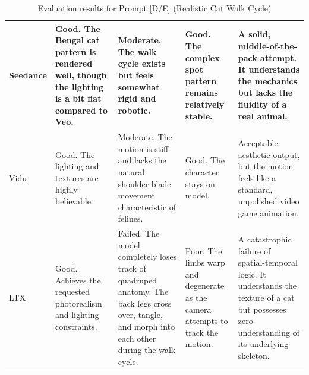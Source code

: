 \documentclass[sigconf]{acmart}
\begin{document}
\begin{table}[H]
\begin{tabularx}{\textwidth}{| l | >{\raggedright\arraybackslash}X | >{\raggedright\arraybackslash}X | >{\raggedright\arraybackslash}X | >{\raggedright\arraybackslash}X |}
        Seedance       & Good. The Bengal cat pattern is rendered well, though the lighting is a bit flat compared to Veo. & Moderate. The walk cycle exists but feels somewhat rigid and robotic.                                                                                                & Good. The complex spot pattern remains relatively stable.                                     & A solid, middle-of-the-pack attempt. It understands the mechanics but lacks the fluidity of a real animal.                                         \\\hline
        Vidu           & Good. The lighting and textures are highly believable.                                            & Moderate. The motion is stiff and lacks the natural shoulder blade movement characteristic of felines.                                                               & Good. The character stays on model.                                                           & Acceptable aesthetic output, but the motion feels like a standard, unpolished video game animation.                                                \\\hline
        LTX            & Good. Achieves the requested photorealism and lighting constraints.                               & Failed. The model completely loses track of quadruped anatomy. The back legs cross over, tangle, and morph into each other during the walk cycle.                    & Poor. The limbs warp and degenerate as the camera attempts to track the motion.               & A catastrophic failure of spatial-temporal logic. It understands the texture of a cat but possesses zero understanding of its underlying skeleton. \\\hline
    \end{tabularx}
    \caption{Evaluation results for Prompt [D/E] (Realistic Cat Walk Cycle)}
    \label{tab:realistic}
\end{table}
\end{document}
